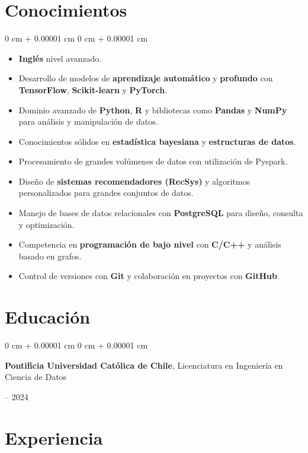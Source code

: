 \documentclass[10pt, letterpaper]{article}
\newenvironment{highlightsforbulletentries}{
    \begin{itemize}[
        topsep=0.10 cm,
        parsep=0.10 cm,
        partopsep=0pt,
        itemsep=0pt,
        leftmargin=10pt
    ]
}{
    \end{itemize}
} %
\newenvironment{onecolentry}{
    \begin{adjustwidth}{
        0 cm + 0.00001 cm
    }{
        0 cm + 0.00001 cm
    }
}{
    \end{adjustwidth}
} %
\newenvironment{twocolentry}[2][]{
    \onecolentry
    \def\secondColumn{#2}
    \setcolumnwidth{\fill, 4.5 cm}
    \begin{paracol}{2}
}{
    \switchcolumn \raggedleft \secondColumn
    \end{paracol}
    \endonecolentry
} %
\begin{document}
\section{Conocimientos}

\begin{onecolentry}
    \begin{highlightsforbulletentries}

\begin{itemize}
    \item \textbf{Inglés} nivel avanzado.
    \item Desarrollo de modelos de \textbf{aprendizaje automático} y \textbf{profundo} con \textbf{TensorFlow}, \textbf{Scikit-learn} y \textbf{PyTorch}.
    \item Dominio avanzado de \textbf{Python}, \textbf{R} y bibliotecas como \textbf{Pandas} y \textbf{NumPy} para análisis y manipulación de datos.
    \item Conocimientos sólidos en \textbf{estadística bayesiana} y \textbf{estructuras de datos}.
    \item Procesamiento de grandes volúmenes de datos con utilización de Pyspark.
    \item Diseño de \textbf{sistemas recomendadores (RecSys)} y algoritmos personalizados para grandes conjuntos de datos.
    \item Manejo de bases de datos relacionales con \textbf{PostgreSQL} para diseño, consulta y optimización.
    \item Competencia en \textbf{programación de bajo nivel} con \textbf{C/C++} y análisis basado en grafos.
    \item Control de versiones con \textbf{Git} y colaboración en proyectos con \textbf{GitHub}.
\end{itemize}
\end{highlightsforbulletentries}
\end{onecolentry}

\section{Educación}

\begin{twocolentry}{
    2021 – 2024
}
    \textbf{Pontificia Universidad Católica de Chile}, Licenciatura en Ingeniería en Ciencia de Datos
\end{twocolentry}

\section{Experiencia}
\end{document}
